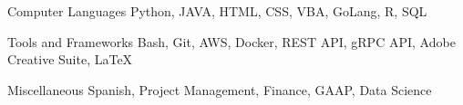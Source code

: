 

\begin{cvskills}


  \cvskill
    {Computer Languages} %
    {Python, JAVA, HTML, CSS, VBA, GoLang, R, SQL} %

  \cvskill
    {Tools and Frameworks} %
    {Bash, Git, AWS, Docker, REST API, gRPC API, Adobe Creative Suite, \LaTeX} %

  \cvskill
    {Miscellaneous} %
    {Spanish, Project Management, Finance, GAAP, Data Science} %

\end{cvskills}
